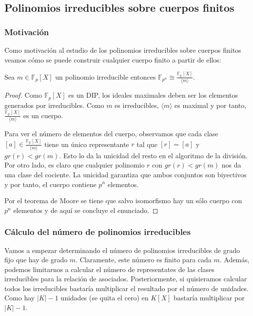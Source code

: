 \subsection{Polinomios irreducibles sobre cuerpos finitos}

\subsubsection{Motivación}

Como motivación al estudio de los polinomios irreducibles sobre cuerpos finitos veamos cómo se puede construir cualquier cuerpo finito a partir de ellos:

\begin{proposition}
Sea $m \in \mathbb{F}_p[X]$ un polinomio irreducible entonces $\mathbb{F}_{p^n} \cong \frac{\mathbb{F_p}[X]}{\langle m \rangle}$. 
\end{proposition}
\begin{proof}
Como $\mathbb{F}_p[X]$ es un DIP, los ideales maximales deben ser los elementos generados por irreducibles. Como $m$ es irreducibles, $\langle m \rangle$ es maximal y por tanto, $\frac{\mathbb{F_p}[X]}{\langle m \rangle}$ es un cuerpo. 

Para ver el número de elementos del cuerpo, observamos que cada clase $[a] \in \frac{\mathbb{F_p}[X]}{\langle m \rangle}$ tiene un único representante $r$ tal que $[r] = [a]$ y $gr(r) < gr(m)$. Esto lo da la unicidad del resto en el algoritmo de la división. Por otro lado, es claro que cualquier polinomio $r$ con $gr(r) < gr(m)$ nos da una clase del cociente. La unicidad garantiza que ambos conjuntos son biyectivos y por tanto, el cuerpo contiene $p^n$ elementos. 

Por el teorema de Moore se tiene que salvo isomorfismo hay un sólo cuerpo con $p^n$ elementos y de aquí se concluye el enunciado. 
\end{proof}

\subsubsection{Cálculo del número de polinomios irreducibles}

Vamos a empezar determinando el número de polinomios irreducibles de grado fijo que hay de grado $m$. Claramente, este número es finito para cada $m$. Además, podemos limitarnos a calcular el número de representates de las clases irreducibles para la relación de asociados. Posteriormente, si quisieramos calcular todos los irreducibles bastaría multiplicar el resultado por el número de unidades. Como hay $|K| - 1$ unidades (se quita el cero) en $K[X]$ bastaría multiplicar por $|K| - 1$. 

